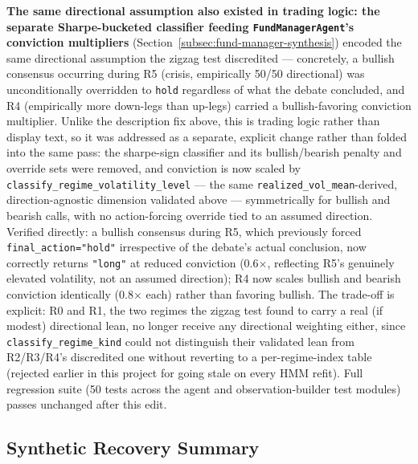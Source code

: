 \textbf{The same directional assumption also existed in trading logic: the separate Sharpe-bucketed classifier feeding \texttt{FundManagerAgent}'s conviction multipliers} (Section~\ref{subsec:fund-manager-synthesis}) encoded the same directional assumption the zigzag test discredited --- concretely, a bullish consensus occurring during R5 (crisis, empirically 50/50 directional) was unconditionally overridden to \texttt{hold} regardless of what the debate concluded, and R4 (empirically more down-legs than up-legs) carried a bullish-favoring conviction multiplier. Unlike the description fix above, this is trading logic rather than display text, so it was addressed as a separate, explicit change rather than folded into the same pass: the sharpe-sign classifier and its bullish/bearish penalty and override sets were removed, and conviction is now scaled by \texttt{classify\_regime\_volatility\_level} --- the same \texttt{realized\_vol\_mean}-derived, direction-agnostic dimension validated above --- symmetrically for bullish and bearish calls, with no action-forcing override tied to an assumed direction. Verified directly: a bullish consensus during R5, which previously forced \texttt{final\_action="hold"} irrespective of the debate's actual conclusion, now correctly returns \texttt{"long"} at reduced conviction (0.6$\times$, reflecting R5's genuinely elevated volatility, not an assumed direction); R4 now scales bullish and bearish conviction identically (0.8$\times$ each) rather than favoring bullish. The trade-off is explicit: R0 and R1, the two regimes the zigzag test found to carry a real (if modest) directional lean, no longer receive any directional weighting either, since \texttt{classify\_regime\_kind} could not distinguish their validated lean from R2/R3/R4's discredited one without reverting to a per-regime-index table (rejected earlier in this project for going stale on every HMM refit). Full regression suite (50 tests across the agent and observation-builder test modules) passes unchanged after this edit.

\subsection{Synthetic Recovery Summary}
\label{subsec:regime-synthetic-results}

